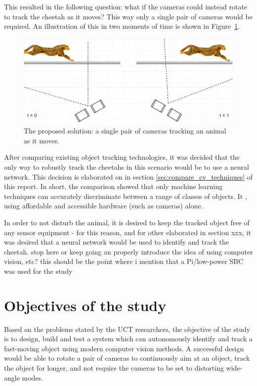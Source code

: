 This resulted in the following question: what if the cameras could instead rotate to track the cheetah as it moves? This way only a single pair of cameras would be required. An illustration of this in two moments of time is shown in Figure~\ref{fig:single_gopro_pair}.

\begin{figure}[h!]
  \centering
  \includegraphics[width=\textwidth]{single_gopro_pair}
  \caption{\label{fig:single_gopro_pair} The proposed solution: a single pair of cameras tracking an animal as it moves.}
\end{figure}

After comparing existing object tracking technologies, it was decided that the only way to robustly track the cheetahs in this scenario would be to use a neural network. This decision is elaborated on in section \ref{sec:compare_cv_techniques} of this report. In short, the comparison showed that only machine learning techniques can accurately discriminate between a range of classes of objects. It , using affordable and accessible hardware (such as cameras) alone.

In order to not disturb the animal, it is desired to keep the tracked object free of any sensor equipment - for this reason, and for other elaborated in section {\color{red} xxx}, it was desired that a neural network would be used to identify and track the cheetah. {\color{red} stop here or keep going an properly introduce the idea of using computer vision, etc?} {\color{red} this should be the point where i mention that a Pi/low-power SBC was used for the study}

\section{Objectives of the study}
Based on the problems stated by the UCT researchers, the objective of the study is to design, build and test a system which can autonomously identify and track a fast-moving object using modern computer vision methods. A successful design would be able to rotate a pair of cameras to continuously aim at an object, track the object for longer, and not require the cameras to be set to distorting wide-angle modes.

